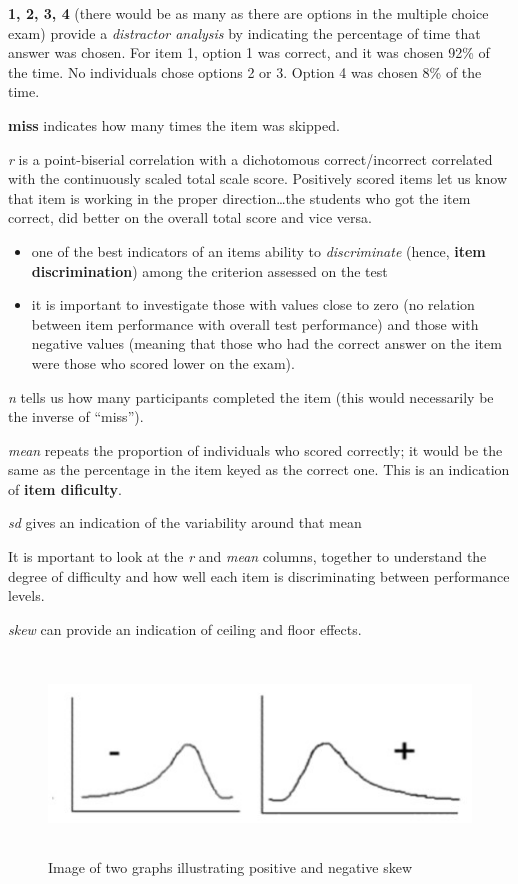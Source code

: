 \documentclass[
  english,
]{book}
\providecommand{\tightlist}{%
  \setlength{\itemsep}{0pt}\setlength{\parskip}{0pt}}
\begin{document}
\textbf{1, 2, 3, 4} (there would be as many as there are options in the multiple choice exam) provide a \emph{distractor analysis} by indicating the percentage of time that answer was chosen. For item 1, option 1 was correct, and it was chosen 92\% of the time. No individuals chose options 2 or 3. Option 4 was chosen 8\% of the time.

\textbf{miss} indicates how many times the item was skipped.

\emph{r} is a point-biserial correlation with a dichotomous correct/incorrect correlated with the continuously scaled total scale score. Positively scored items let us know that item is working in the proper direction\ldots the students who got the item correct, did better on the overall total score and vice versa.

\begin{itemize}
\tightlist
\item
  one of the best indicators of an items ability to \emph{discriminate} (hence, \textbf{item discrimination}) among the criterion assessed on the test
\item
  it is important to investigate those with values close to zero (no relation between item performance with overall test performance) and those with negative values (meaning that those who had the correct answer on the item were those who scored lower on the exam).
\end{itemize}

\emph{n} tells us how many participants completed the item (this would necessarily be the inverse of ``miss'').

\emph{mean} repeats the proportion of individuals who scored correctly; it would be the same as the percentage in the item keyed as the correct one. This is an indication of \textbf{item dificulty}.

\emph{sd} gives an indication of the variability around that mean

It is mportant to look at the \emph{r} and \emph{mean} columns, together to understand the degree of difficulty and how well each item is discriminating between performance levels.

\emph{skew} can provide an indication of ceiling and floor effects.

\begin{figure}
\hypertarget{id}{%
\centering
\includegraphics[width=6.25in,height=2.08333in]{images/ItemAnalExam/skew.jpg}
\caption{Image of two graphs illustrating positive and negative skew}\label{id}
}
\end{figure}
\end{document}
